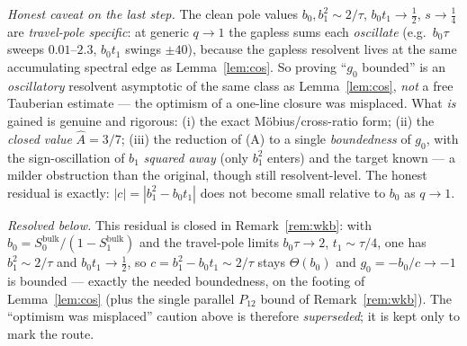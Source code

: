 \begin{remark}[The exact M\"obius structure: $\widehat A=3/7$, and (A) reduced to a boundedness]
\emph{Honest caveat on the last step.} The clean pole values $b_0,b_1^2\sim2/\tau$, $b_0t_1\to\tfrac12$,
$s\to\tfrac14$ are \emph{travel-pole specific}: at generic $q\to1$ the gapless sums each \emph{oscillate}
(e.g.\ $b_0\tau$ sweeps $0.01$--$2.3$, $b_0t_1$ swings $\pm40$), because the gapless resolvent lives at
the same accumulating spectral edge as Lemma~\ref{lem:cos}. So proving ``$g_0$ bounded'' is an
\emph{oscillatory} resolvent asymptotic of the same class as Lemma~\ref{lem:cos}, \emph{not} a free
Tauberian estimate --- the optimism of a one-line closure was misplaced. What \emph{is} gained is
genuine and rigorous: (i) the exact M\"obius/cross-ratio form; (ii) the \emph{closed value}
$\widehat A=3/7$; (iii) the reduction of (A) to a single \emph{boundedness} of $g_0$, with the
sign-oscillation of $b_1$ \emph{squared away} (only $b_1^2$ enters) and the target known --- a milder
obstruction than the original, though still resolvent-level. The honest residual is exactly:
$|c|=|b_1^2-b_0t_1|$ does not become small relative to $b_0$ as $q\to1$.

\noindent\emph{Resolved below.} This residual is closed in Remark~\ref{rem:wkb}: with
$b_0=S_0^{\mathrm{bulk}}/(1-S_1^{\mathrm{bulk}})$ and the travel-pole limits $b_0\tau\to2$, $t_1\sim\tau/4$,
one has $b_1^2\sim2/\tau$ and $b_0t_1\to\tfrac12$, so $c=b_1^2-b_0t_1\sim2/\tau$ stays $\Theta(b_0)$ and
$g_0=-b_0/c\to-1$ is bounded --- exactly the needed boundedness, on the footing of Lemma~\ref{lem:cos}
\textup(plus the single parallel $P_{12}$ bound of Remark~\ref{rem:wkb}\textup). The ``optimism was
misplaced'' caution above is therefore \emph{superseded}; it is kept only to mark the route.
\end{remark}


